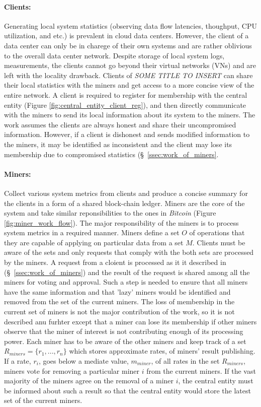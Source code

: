 \documentclass{article}
\newcommand{\projTitle}{SOME TITLE TO INSERT}
\begin{document}
\paragraph{Clients:} Generating local system statistics (observing data flow latencies, thoughput, CPU utilization, and etc.) is prevalent in cloud data centers. However, the client of a data center can only be in charege of their own systems and are rather oblivious to the overall data center network. Despite storage of local system logs, measurements, the clients cannot go beyond their virtual networks (VNs) and are left with the locality drawback. Clients of \textit{\projTitle} can share their local statistics with the miners and get access to a more concise view of the entire network. A client is required to register for membership with the central entity (Figure \ref{fig:central_entity_client_reg}), and then directly communicate with the miners to send its local information about its system to the miners. The work assumes the clients are always honest and share their uncompromised information. However, if a client is dishonest and sends modified information to the miners, it may be identified as inconsistent and the client may lose its membership due to compromised statistics (\S\ \ref{ssec:work_of_miners}.     
\par       

\paragraph{Miners:} Collect various system metrics from clients and produce a concise summary for the clients in a form of a shared block-chain ledger. Miners are the core of the system and take similar reponsibilities to the ones in \textit{Bitcoin} (Figure \ref{fig:miner_work_flow}). The major responsibility of the miners is to process system metrics in a required manner. Miners define a set $O$ of operations that they are capable of applying on particular data from a set $M$. Clients must be aware of the sets and only
requests that comply with the both sets are processed by the miners. A request from a cloient is processed as it it described in (\S\ \ref{ssec:work_of_miners}) and the result of the request is shared among all the miners for voting and approval. Such a step is needed to
ensure that all miners have the same information and that 'lazy' miners would be identified and removed from the set of the current miners. The loss of membership in the current set of miners is not the major contribution of the work, so it is not described anu furhter except 
that a miner can lose its membership if other miners observe that the miner of interest is not contributing enough of its processing power. Each miner has to be aware of the other miners and keep track of a set $R_{miners} = \{r_1, ..., r_n\}$ which stores approximate rates, 
of  miners' result publishing. If a rate, $r_i$, goes below a mediate value, $m_{miner}$, of all rates in the set $R_{miners}$, miners vote for removing a particular miner $i$ from the current miners. If the vast majority of the miners agree on the removal of a miner $i$, 
the central entity must be informed about such a result so that the central entity would store the latest set of the current miners.    
\par
\end{document}
